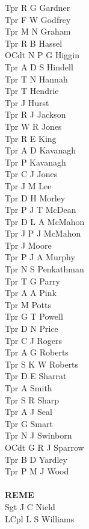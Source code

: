 \begin{multicols}{2}
  Tpr R G Gardner \\
  Tpr F W Godfrey \\
  Tpr M N Graham \\
  Tpr R B Hassel \\
  OCdt N P G Higgin \\
  Tpr A D S Hindell \\
  Tpr T N Hannah \\
  Tpr T Hendrie \\
  Tpr J Hurst \\
  Tpr R J Jackson \\
  Tpr W R Jones \\
  Tpr R E King \\
  Tpr A D Kavanagh \\
  Tpr P Kavanagh \\
  Tpr C J Jones \\
  Tpr J M Lee \\
  Tpr D H Morley \\
  Tpr P J T McDean \\
  Tpr D L A McMahon \\
  Tpr J P J McMahon \\
  Tpr J Moore \\
  Tpr P J A Murphy \\
  Tpr N S Penkathman \\
  Tpr T G Parry \\
  Tpr A A Pink \\
  Tpr M Potts \\
  Tpr G T Powell \\
  Tpr D N Price \\
  Tpr C J Rogers \\
  Tpr A G Roberts \\
  Tpr S K W Roberts \\
  Tpr D E Sharrat \\
  Tpr A Smith \\
  Tpr S R Sharp \\
  Tpr A J Seal \\
  Tpr G Smart \\
  Tpr N J Swinborn \\
  OCdt G R J Sparrow \\
  Tpr B D Yardley \\
  Tpr P M J Wood \\
  \\
  \textbf{REME} \\
  Sgt J C Nield \\
  LCpl L S Williams \\

\end{multicols}
